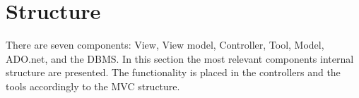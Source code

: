 \section{Structure}
There are seven components: View, View model, Controller, Tool, Model, ADO.net, and the DBMS. In this section the most relevant components internal structure are presented. The functionality is placed in the controllers and the tools accordingly to the MVC structure.
 





